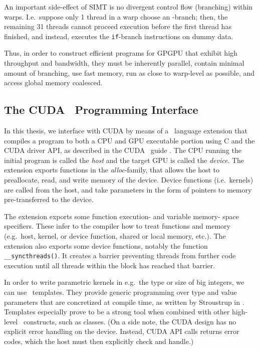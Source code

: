  An important side-effect of SIMT is no divergent control flow (branching)
  within warps. I.e.\ suppose only 1 thread in a warp choose an -branch;
  then, the remaining 31 threads cannot proceed execution before the first
  thread has finished, and instead, executes the \texttt{if}-branch instructions
  on dummy data.

  Thus, in order to construct efficient programs for GPGPU that exhibit high
  throughput and bandwidth, they must be inherently parallel, contain minimal
  amount of branching, use fast memory, run as close to warp-level as possible,
  and access global memory coalesced.

\subsection{The CUDA \cpp\ Programming Interface}
\label{subsec:cuda}

In this thesis, we interface with CUDA by means of a \cpp\ language extension
that compiles a program to both a CPU and GPU executable portion using C and the
CUDA driver API, as described in the CUDA \cpp\ guide \cite{cudaguide}. The CPU
running the initial program is called the \textit{host} and the target GPU is
called the \textit{device}. The extension exports functions in the
\textit{alloc}-family, that allows the host to preallocate, read, and write
memory of the device. Device functions (i.e.\ kernels) are called from the host,
and take parameters in the form of pointers to memory pre-transferred to the
device.

The extension exports some function execution- and variable memory- space
specifiers. These infer to the compiler how to treat functions and memory (e.g.\
host, kernel, or device function, shared or local memory, etc.). The extension
also exports some device functions, notably the function
\texttt{\_\_syncthreads()}. It creates a barrier preventing threads from further
code execution until all threads within the block has reached that barrier.

In order to write parametric kernels in e.g.\ the type or size of big integers,
we can use \cpp\ templates. They provide generic programming over type and value
parameters that are concretized at compile time, as written by Stroustrup in
\cite{stroustrup}. Templates especially prove to be a strong tool when combined
with other high-level \cpp\ constructs, such as classes.  (On a side note, the
CUDA design has no explicit error handling on the device. Instead, CUDA API
calls returns error codes, which the host must then explicitly check and
handle.)

